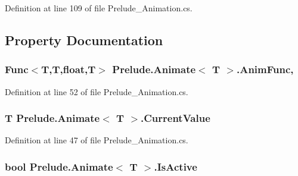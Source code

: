 Definition at line 109 of file Prelude\+\_\+\+Animation.\+cs.



\subsection{Property Documentation}
\hypertarget{class_prelude_1_1_animate_3_01_t_01_4_a20be9c1557b17e88ad7aa6c0a2c3c518}{
\subsubsection[{Anim\+Func}]{\setlength{\rightskip}{0pt plus 5cm}Func$<$T,T,float,T$>$ Prelude.\+Animate$<$ T $>$.Anim\+Func\hspace{0.3cm}{\ttfamily [get]}, {\ttfamily [set]}}}\label{class_prelude_1_1_animate_3_01_t_01_4_a20be9c1557b17e88ad7aa6c0a2c3c518}


Definition at line 52 of file Prelude\+\_\+\+Animation.\+cs.

\hypertarget{class_prelude_1_1_animate_3_01_t_01_4_a114a72fd0ef11d6c372321a0b4124b89}{
\subsubsection[{Current\+Value}]{\setlength{\rightskip}{0pt plus 5cm}T Prelude.\+Animate$<$ T $>$.Current\+Value\hspace{0.3cm}{\ttfamily [get]}}}\label{class_prelude_1_1_animate_3_01_t_01_4_a114a72fd0ef11d6c372321a0b4124b89}


Definition at line 47 of file Prelude\+\_\+\+Animation.\+cs.

\hypertarget{class_prelude_1_1_animate_3_01_t_01_4_a2c394b77e45fd05e6d63260dfbdd1a92}{
\subsubsection[{Is\+Active}]{\setlength{\rightskip}{0pt plus 5cm}bool Prelude.\+Animate$<$ T $>$.Is\+Active\hspace{0.3cm}{\ttfamily [get]}}}\label{class_prelude_1_1_animate_3_01_t_01_4_a2c394b77e45fd05e6d63260dfbdd1a92}


